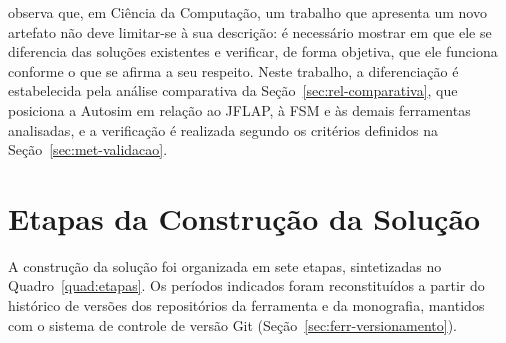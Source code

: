 \documentclass[
    12pt
    ,oneside
    ,a4paper
    ,chapter=TITLE
    ,section=TITLE
    ,sumario=abnt-6027-2012]{abntex2}
\begin{document}
 observa que, em Ciência da Computação, um trabalho que apresenta um
novo artefato não deve limitar-se à sua descrição: é necessário mostrar em que ele se
diferencia das soluções existentes e verificar, de forma objetiva, que ele funciona conforme o
que se afirma a seu respeito. Neste trabalho, a diferenciação é estabelecida pela análise
comparativa da Seção~\ref{sec:rel-comparativa}, que posiciona a Autosim em relação ao JFLAP, à
FSM e às demais ferramentas analisadas, e a verificação é realizada segundo os critérios
definidos na Seção~\ref{sec:met-validacao}.

\section{Etapas da Construção da Solução}
\label{sec:met-etapas}

A construção da solução foi organizada em sete etapas, sintetizadas no
Quadro~\ref{quad:etapas}. Os períodos indicados foram reconstituídos a partir do histórico de
versões dos repositórios da ferramenta e da monografia, mantidos com o sistema de controle de
versão Git (Seção~\ref{sec:ferr-versionamento}).
\end{document}
